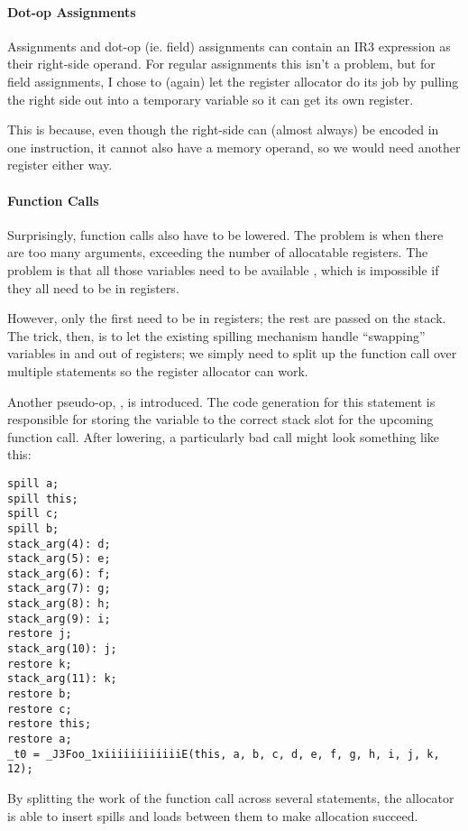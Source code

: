 \documentclass[12pt]{article}
\begin{document}
\paragraph{Dot-op Assignments}

Assignments and dot-op (ie. field) assignments can contain an IR3 expression as their right-side operand. For regular
assignments this isn't a problem, but for field assignments, I chose to (again) let the register allocator do its
job by pulling the right side out into a temporary variable so it can get its own register.

This is because, even though the right-side can (almost always) be encoded in one instruction, it cannot also have
a memory operand, so we would need another register either way.


\paragraph{Function Calls}

Surprisingly, function calls also have to be lowered. The problem is when there are too many arguments, exceeding
the number of allocatable registers. The problem is that all those variables need to be available
, which is impossible if they all need to be in registers.

However, only the first  need to be in registers; the rest are passed on the stack. The trick, then,
is to let the existing spilling mechanism handle \enquote{swapping} variables in and out of registers; we simply
need to split up the function call over multiple statements so the register allocator can work.

Another pseudo-op, , is introduced. The code generation for this statement is responsible
for storing the variable to the correct stack slot for the upcoming function call. After lowering, a particularly bad
call might look something like this:

\begin{verbatim}
spill a;
spill this;
spill c;
spill b;
stack_arg(4): d;
stack_arg(5): e;
stack_arg(6): f;
stack_arg(7): g;
stack_arg(8): h;
stack_arg(9): i;
restore j;
stack_arg(10): j;
restore k;
stack_arg(11): k;
restore b;
restore c;
restore this;
restore a;
_t0 = _J3Foo_1xiiiiiiiiiiiiE(this, a, b, c, d, e, f, g, h, i, j, k, 12);
\end{verbatim}

By splitting the work of the function call across several statements, the allocator is able to insert spills and
loads between them to make allocation succeed.
\end{document}
